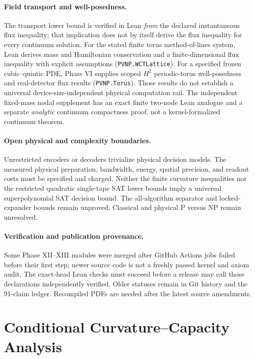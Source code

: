 \documentclass[11pt,a4paper]{article}
\begin{document}
\paragraph{Field transport and well-posedness.}
The transport lower bound is verified
in Lean \emph{from} the declared
instantaneous flux inequality; that
implication does not by itself
derive the flux inequality for every
continuum solution.
For the stated finite torus
method-of-lines system, Lean derives
mass and Hamiltonian conservation
and a finite-dimensional flux
inequality with explicit assumptions
(\texttt{PVNP.WCTLattice}).
For a specified frozen cubic--quintic
PDE, Phase VI supplies scoped
$H^2$ periodic-torus well-posedness
and real-detector flux results
(\texttt{PVNP.Torus}).
Those results do not establish
a universal device-size-independent
physical computation rail.
The independent fixed-mass nodal
supplement has an exact finite
two-node Lean analogue and a
separate \emph{analytic} continuum
compactness proof, not a
kernel-formalized continuum theorem.

\paragraph{Open physical and complexity boundaries.}
Unrestricted encoders or decoders
trivialize physical decision models.
The measured physical preparation,
bandwidth, energy, spatial
precision, and readout costs
must be specified and charged.
Neither the finite curvature
inequalities nor the restricted
quadratic single-tape SAT lower
bounds imply a universal
superpolynomial SAT decision bound.
The all-algorithm separator and
locked-expander bounds remain
unproved.  Classical and physical
P versus NP remain unresolved.

\paragraph{Verification and publication provenance.}
Some Phase XII--XIII modules were
merged after GitHub Actions jobs
failed before their first step;
newer source code is not a
freshly passed kernel and axiom
audit.  The exact-head Lean checks
must succeed before a release
may call those declarations
independently verified.
Older statuses remain in Git
history and the 91-claim ledger.
Recompiled PDFs are needed
after the latest source amendments.

\clearpage
\appendix
\section{Conditional Curvature--Capacity Analysis}
\label{sec:curvature_capacity}
\end{document}
